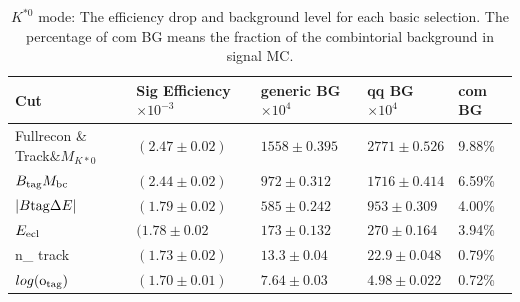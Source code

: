 \begin{table}[ht]
 \small
\begin{center}
\begin{tabular}{ |p{2.2cm}||p{3.6cm}||p{2.8cm}||p{2.1cm}||p{1.3cm}|| }
 \hline
 Cut& Sig Efficiency$\times10^{-3}$  & generic BG$\times10^{4}$&qq BG$\times10^{4}$& com BG \\
\hline
\hline
  Fullrecon \& Track\&$M_{K*0} $	& $(2.47\pm 0.02)$ 	&$1558\pm  0.395$&$2771\pm 0.526$&9.88\% \\ %
 \hline
 $B_{\rm{tag}}M_{\rm{bc}}$  			& $(2.44\pm 0.02)$ 	&$972 \pm 0.312$&$1716 \pm 0.414$&6.59\%\\ %
 \hline
 $ | B{\rm{tag}}\Delta E |$  			& $(1.79\pm 0.02)$	&$585 \pm 0.242$&$953 \pm0.309$	&4.00\%\\ %
 \hline
 $E_{\rm{ecl}}$					& $(1.78\pm 0.02$	&$173  \pm 0.132$&$270\pm0.164$	&3.94\%\\ %
 \hline
 n\_ track					& $(1.73 \pm 0.02)$	&$13.3\pm 0.04$	&$22.9\pm0.048$	&0.79\%\\ %
 \hline		
$log(\rm{o_{tag}})$ 				& $(1.70 \pm0.01)$	&$7.64\pm0.03$	&$4.98\pm0.022$	&0.72\% \\ %
 \hline
\end{tabular}
\caption{$K^{*0}$ mode: The efficiency drop and background level for each basic selection. The percentage of com BG means the fraction of the combintorial background in signal MC. } \label{t:efficiency_k0}
\end{center}
\end{table}
